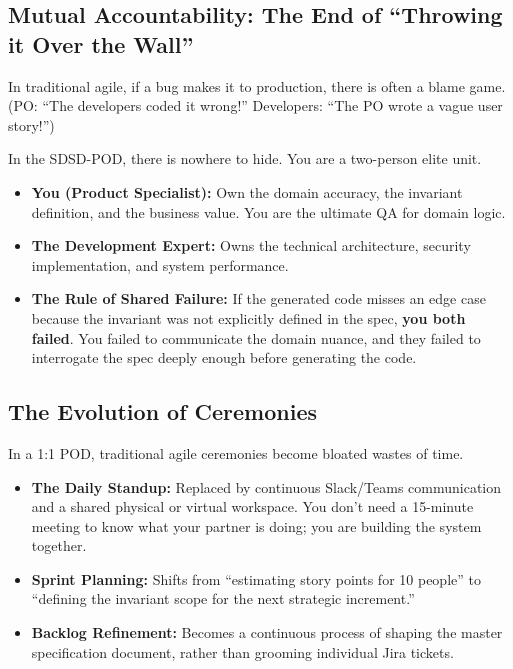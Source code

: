 \documentclass[
  11pt,
  openany,
  oneside]{book}
\providecommand{\tightlist}{%
  \setlength{\itemsep}{0pt}\setlength{\parskip}{0pt}}
\begin{document}
\subsection{Mutual Accountability: The End of ``Throwing it Over the
Wall''}\label{mutual-accountability-the-end-of-throwing-it-over-the-wall}

In traditional agile, if a bug makes it to production, there is often a
blame game. (PO: ``The developers coded it wrong!'' Developers: ``The PO
wrote a vague user story!'')

In the SDSD-POD, there is nowhere to hide. You are a two-person elite
unit.

\begin{itemize}
\tightlist
\item
  \textbf{You (Product Specialist):} Own the domain accuracy, the
  invariant definition, and the business value. You are the ultimate QA
  for domain logic.
\item
  \textbf{The Development Expert:} Owns the technical architecture,
  security implementation, and system performance.
\item
  \textbf{The Rule of Shared Failure:} If the generated code misses an
  edge case because the invariant was not explicitly defined in the
  spec, \textbf{you both failed}. You failed to communicate the domain
  nuance, and they failed to interrogate the spec deeply enough before
  generating the code.
\end{itemize}

\subsection{The Evolution of
Ceremonies}\label{the-evolution-of-ceremonies}

In a 1:1 POD, traditional agile ceremonies become bloated wastes of
time.

\begin{itemize}
\tightlist
\item
  \textbf{The Daily Standup:} Replaced by continuous Slack/Teams
  communication and a shared physical or virtual workspace. You don't
  need a 15-minute meeting to know what your partner is doing; you are
  building the system together.
\item
  \textbf{Sprint Planning:} Shifts from ``estimating story points for 10
  people'' to ``defining the invariant scope for the next strategic
  increment.''
\item
  \textbf{Backlog Refinement:} Becomes a continuous process of shaping
  the master specification document, rather than grooming individual
  Jira tickets.
\end{itemize}
\end{document}
